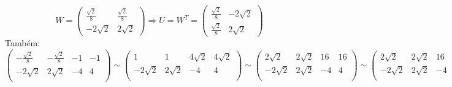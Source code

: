 \documentclass[11pt,a4paper]{article}
\begin{document}
{{\[
W = \begin{pmatrix}
\frac{\sqrt{2}}{8} & \frac{\sqrt{2}}{8} \\
 -2 \sqrt{2} &  2\sqrt{2}
\end{pmatrix} \Rightarrow U = W^T = \begin{pmatrix}
\frac{\sqrt{2}}{8} &  -2 \sqrt{2}\\
 \frac{\sqrt{2}}{8}  &  2\sqrt{2}
\end{pmatrix}
\]
Também:
\[
\left(\begin{array}{cc|cc}
 -\frac{\sqrt{2}}{8} & -\frac{\sqrt{2}}{8} &  -1 & -1 \\
  -2 \sqrt{2}& 2\sqrt{2} & -4 & 4 \\
\end{array} \right) \sim \left(\begin{array}{cc|cc}
 1 & 1 & 4 \sqrt{2} & 4 \sqrt{2} \\
  -2 \sqrt{2}& 2\sqrt{2} & -4 & 4 \\
\end{array} \right) \sim \left(\begin{array}{cc|cc}
2 \sqrt{2} & 2 \sqrt{2} & 16 & 16 \\
-2 \sqrt{2}& 2\sqrt{2} & -4 & 4 \\
\end{array} \right) \sim \left(\begin{array}{cc|cc}
2 \sqrt{2} & 2 \sqrt{2} & 16 & 16 \\
-2 \sqrt{2}& 2\sqrt{2} & -4 & 4 \\
\end{array} \right)  \sim \left(\begin{array}{cc|cc}
2 \sqrt{2} & 2 \sqrt{2} & 16 & 16 \\
0 & 4\sqrt{2} & 12 & 20 \\
\end{array} \right)
\sim \left(\begin{array}{cc|cc}
2 \sqrt{2} & 2 \sqrt{2} & 16 & 16 \\
0 & 1 & \frac{3 \sqrt{2}}{2} & \frac{5 \sqrt{2}}{2} \\
\end{array} \right)\sim  \left(\begin{array}{cc|cc}
1 & 1 & 4 \sqrt{2} & 4 \sqrt{2} \\
0 & 1 & \frac{3 \sqrt{2}}{2} & \frac{5 \sqrt{2}}{2} \\
\end{array} \right) \sim  \left(\begin{array}{cc|cc}
1 & 0 & \frac{5 \sqrt{2}}{2} & \frac{3 \sqrt{2}}{2} \\

\end{array}\]}}
\end{document}

